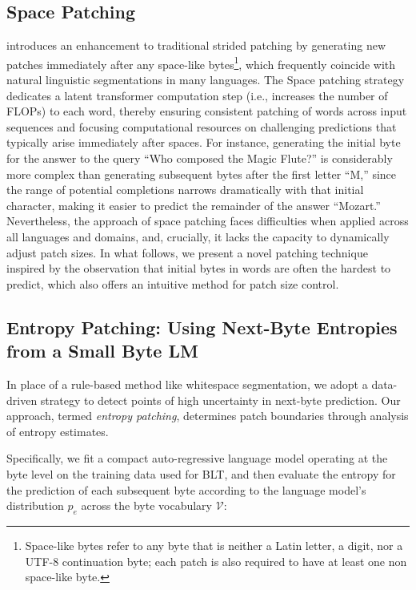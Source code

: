 \subsection{Space Patching}
\label{section:white-patch}

\citet{slagle2024spacebyte} introduces an enhancement to traditional strided patching by generating new patches immediately after any space-like bytes\footnote{
    Space-like bytes refer to any byte that is neither a Latin letter, a digit, nor a UTF-8 continuation byte; each patch is also required to have at least one non space-like byte.
}, which frequently coincide with natural linguistic segmentations in many languages. The Space patching strategy dedicates a latent transformer computation step (i.e., increases the number of FLOPs) to each word, thereby ensuring consistent patching of words across input sequences and focusing computational resources on challenging predictions that typically arise immediately after spaces. For instance, generating the initial byte for the answer to the query ``Who composed the Magic Flute?\uline{\hspace{.6em}}'' is considerably more complex than generating subsequent bytes after the first letter ``M,'' since the range of potential completions narrows dramatically with that initial character, making it easier to predict the remainder of the answer ``Mozart.'' Nevertheless, the approach of space patching faces difficulties when applied across all languages and domains, and, crucially, it lacks the capacity to dynamically adjust patch sizes. In what follows, we present a novel patching technique inspired by the observation that initial bytes in words are often the hardest to predict, which also offers an intuitive method for patch size control.

\subsection{Entropy Patching: Using Next-Byte Entropies from a Small Byte LM}
\label{section:dyn-patch}

In place of a rule-based method like whitespace segmentation, we adopt a data-driven strategy to detect points of high uncertainty in next-byte prediction. Our approach, termed \textit{entropy patching}, determines patch boundaries through analysis of entropy estimates.

Specifically, we fit a compact auto-regressive language model operating at the byte level on the training data used for {\textsc BLT}, and then evaluate the entropy for the prediction of each subsequent byte according to the language model's distribution $p_{e}$ across the byte vocabulary $\mathcal{V}$:

